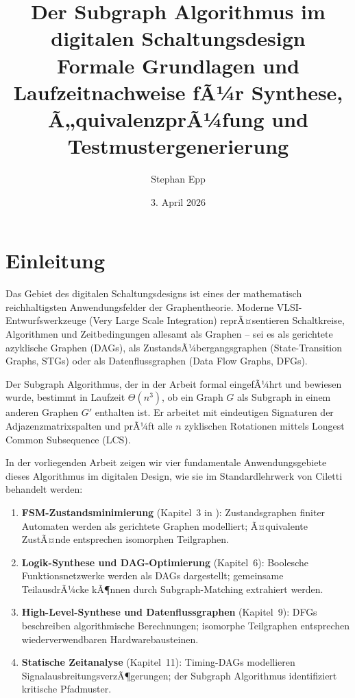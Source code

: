 ﻿\documentclass[a4paper,12pt]{article}
\title{%
  \textbf{Der Subgraph Algorithmus im \\ digitalen Schaltungsdesign}\\[0.5em]
  \large Formale Grundlagen und Laufzeitnachweise fÃ¼r Synthese,\\
  Ã„quivalenzprÃ¼fung und Testmustergenerierung
}
\author{Stephan Epp}
\date{3. April 2026}
\theoremstyle{definition}
\begin{document}
\maketitle
\tableofcontents
\newpage

\section{Einleitung}

Das Gebiet des digitalen Schaltungsdesigns ist eines der mathematisch reichhaltigsten
Anwendungsfelder der Graphentheorie. Moderne VLSI-Entwurfswerkzeuge (Very Large Scale
Integration) reprÃ¤sentieren Schaltkreise, Algorithmen und Zeitbedingungen allesamt als
Graphen -- sei es als gerichtete azyklische Graphen (DAGs), als ZustandsÃ¼bergangsgraphen
(State-Transition Graphs, STGs) oder als Datenflussgraphen (Data Flow Graphs, DFGs).

Der Subgraph Algorithmus, der in der Arbeit \cite{subgraph2026} formal eingefÃ¼hrt und
bewiesen wurde, bestimmt in Laufzeit $\Theta(n^3)$, ob ein Graph $G$ als Subgraph in einem
anderen Graphen $G'$ enthalten ist. Er arbeitet mit eindeutigen Signaturen der
Adjazenzmatrixspalten und prÃ¼ft alle $n$ zyklischen Rotationen mittels Longest Common
Subsequence (LCS).

In der vorliegenden Arbeit zeigen wir vier fundamentale Anwendungsgebiete dieses
Algorithmus im digitalen Design, wie sie im Standardlehrwerk von Ciletti
\cite{ciletti2011} behandelt werden:

\begin{enumerate}
  \item \textbf{FSM-Zustandsminimierung} (Kapitel~3 in \cite{ciletti2011}): Zustandsgraphen
        finiter Automaten werden als gerichtete Graphen modelliert; Ã¤quivalente ZustÃ¤nde
        entsprechen isomorphen Teilgraphen.
  \item \textbf{Logik-Synthese und DAG-Optimierung} (Kapitel~6): Boolesche
        Funktionsnetzwerke werden als DAGs dargestellt; gemeinsame TeilausdrÃ¼cke kÃ¶nnen
        durch Subgraph-Matching extrahiert werden.
  \item \textbf{High-Level-Synthese und Datenflussgraphen} (Kapitel~9): DFGs beschreiben
        algorithmische Berechnungen; isomorphe Teilgraphen entsprechen wiederverwendbaren
        Hardwarebausteinen.
  \item \textbf{Statische Zeitanalyse} (Kapitel~11): Timing-DAGs modellieren
        SignalausbreitungsverzÃ¶gerungen; der Subgraph Algorithmus identifiziert kritische
        Pfadmuster.
\end{enumerate}
\end{document}
